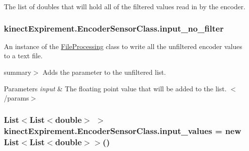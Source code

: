 The list of doubles that will hold all of the filtered values read in by the encoder. 

\subsubsection[{\texorpdfstring{input\+\_\+no\+\_\+filter}{input_no_filter}}]{ kinect\+Expirement.\+Encoder\+Sensor\+Class.\+input\+\_\+no\+\_\+filter\hspace{0.3cm}{\ttfamily [static]}}\hypertarget{classkinect_expirement_1_1_encoder_sensor_class_a37bd8f02067e70fcb1ae1c2a97e86aed}{}\label{classkinect_expirement_1_1_encoder_sensor_class_a37bd8f02067e70fcb1ae1c2a97e86aed}


An instance of the {\ttfamily \hyperlink{classkinect_expirement_1_1_file_processing}{File\+Processing}} class to write all the unfiltered encoder values to a text file. 

summary$>$ Adds the parameter to the unfiltered list. 


\begin{DoxyParams}{Parameters}
{\em input} & The floating point value that will be added to the list. $<$/params$>$ \\
\hline
\end{DoxyParams}
\subsubsection[{\texorpdfstring{input\+\_\+values}{input_values}}]{\setlength{\rightskip}{0pt plus 5cm}List$<$List$<$double$>$ $>$ kinect\+Expirement.\+Encoder\+Sensor\+Class.\+input\+\_\+values = new List$<$List$<$double$>$$>$()\hspace{0.3cm}{\ttfamily [static]}}\hypertarget{classkinect_expirement_1_1_encoder_sensor_class_a8f77045a1820ffa39d9d162a404938ff}{}\label{classkinect_expirement_1_1_encoder_sensor_class_a8f77045a1820ffa39d9d162a404938ff}


